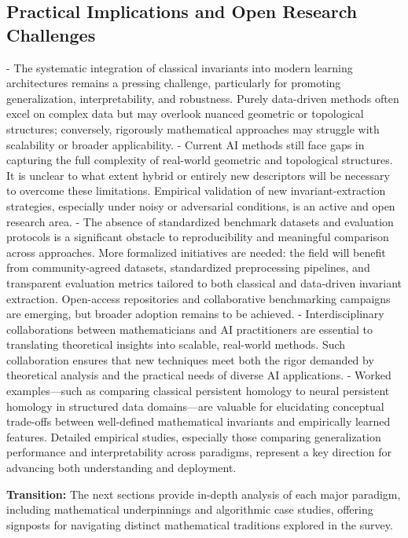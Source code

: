 \documentclass[sigconf]{acmart}
\begin{document}
\subsection*{Practical Implications and Open Research Challenges}
- The systematic integration of classical invariants into modern learning architectures remains a pressing challenge, particularly for promoting generalization, interpretability, and robustness. Purely data-driven methods often excel on complex data but may overlook nuanced geometric or topological structures; conversely, rigorously mathematical approaches may struggle with scalability or broader applicability.
- Current AI methods still face gaps in capturing the full complexity of real-world geometric and topological structures. It is unclear to what extent hybrid or entirely new descriptors will be necessary to overcome these limitations. Empirical validation of new invariant-extraction strategies, especially under noisy or adversarial conditions, is an active and open research area.
- The absence of standardized benchmark datasets and evaluation protocols is a significant obstacle to reproducibility and meaningful comparison across approaches. More formalized initiatives are needed: the field will benefit from community-agreed datasets, standardized preprocessing pipelines, and transparent evaluation metrics tailored to both classical and data-driven invariant extraction. Open-access repositories and collaborative benchmarking campaigns are emerging, but broader adoption remains to be achieved.
- Interdisciplinary collaborations between mathematicians and AI practitioners are essential to translating theoretical insights into scalable, real-world methods. Such collaboration ensures that new techniques meet both the rigor demanded by theoretical analysis and the practical needs of diverse AI applications.
- Worked examples—such as comparing classical persistent homology to neural persistent homology in structured data domains—are valuable for elucidating conceptual trade-offs between well-defined mathematical invariants and empirically learned features. Detailed empirical studies, especially those comparing generalization performance and interpretability across paradigms, represent a key direction for advancing both understanding and deployment.

\textbf{Transition:} The next sections provide in-depth analysis of each major paradigm, including mathematical underpinnings and algorithmic case studies, offering signposts for navigating distinct mathematical traditions explored in the survey.
\end{document}
